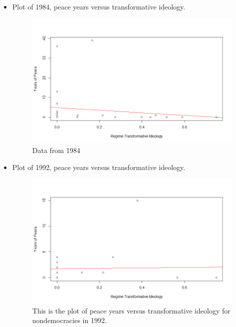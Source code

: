 \documentclass[12pt]{article}
\begin{document}
\begin{itemize}
\item Plot of 1984, peace years versus transformative ideology.

\begin{figure}[H]
\centering
\caption[]{Data from 1984}
\label{fig:ti-vs-peaceyears-1984}
\includegraphics[width=0.9\linewidth]{ti-vs-peaceyears-1984}
\end{figure}



\item Plot of 1992, peace years versus transformative ideology.

\begin{figure}[H]
\centering
\caption[Data from 1992]{This is the plot of peace years versus transformative ideology for nondemocracies in 1992.}
\label{fig:ti-vs-oeaceyears-1992}
\includegraphics[width=0.9\linewidth]{ti-vs-oeaceyears-1992}
\end{figure}



\end{itemize}
\end{document}

